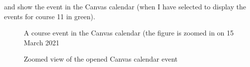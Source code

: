 \clearpage
{} and   show the event in the Canvas calendar (when I have selected to display the events for course 11 in green).
\begin{figure}[!ht]
  \begin{center}
  \end{center}
  \caption{A course event in the Canvas calendar (the figure is zoomed in on 15 March 2021}
  \label{fig:canvasCalendarEvent}
\end{figure}

\begin{figure}[!hb]
  \begin{center}
  \end{center}
  \caption{Zoomed view of the opened Canvas calendar event}
  \label{fig:canvasCalendarEventZoomed}
\end{figure}
\newpage


